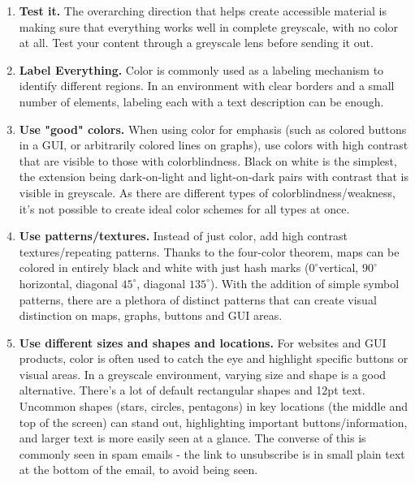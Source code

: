 \documentclass{article}
\begin{document}
\begin{enumerate}
    \item \textbf{Test it.} The overarching direction that helps create accessible  material is making sure that everything works well in complete greyscale, with no color at all. Test your content through a greyscale lens before sending it out.
    \item \textbf{Label Everything.} Color is commonly used as a labeling mechanism to identify different regions. In an environment with clear borders and a small number of elements, labeling each with a text description can be enough.
    \item \textbf{Use "good" colors.} When using color for emphasis (such as colored buttons in a GUI, or arbitrarily colored lines on graphs), use colors with high contrast that are visible to those with colorblindness. Black on white is the simplest, the extension being dark-on-light and light-on-dark pairs with contrast that is visible in greyscale. As there are different types of colorblindness/weakness, it's not possible to create ideal color schemes for all types at once.
    \item \textbf{Use patterns/textures.} Instead of just color, add high contrast textures/repeating patterns. Thanks to the four-color theorem, maps can be colored in entirely black and white with just hash marks ($0^{\circ}$vertical, $90^{\circ}$horizontal, diagonal $45^{\circ}$, diagonal $135^{\circ}$). With the addition of simple symbol patterns, there are a plethora of distinct patterns that can create visual distinction on maps, graphs, buttons and GUI areas.
    \item \textbf{Use different sizes and shapes and locations.} For websites and GUI products, color is often used to catch the eye and highlight specific buttons or visual areas. In a greyscale environment, varying size and shape is a good alternative. There's a lot of default rectangular shapes and 12pt text. Uncommon shapes (stars, circles, pentagons) in key locations (the middle and top of the screen) can stand out, highlighting important buttons/information, and larger text is more easily seen at a glance. The converse of this is commonly seen in spam emails - the link to unsubscribe is in small plain text at the bottom of the email, to avoid being seen.
\end{enumerate}



\collab{} 
\end{document}
